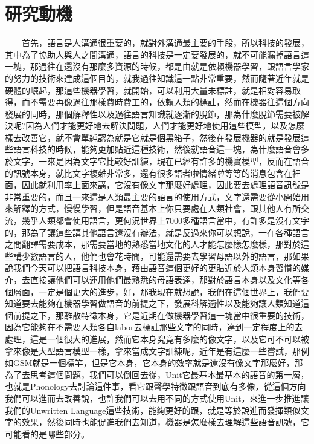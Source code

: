 \section{研究動機}

　　首先，語言是人溝通很重要的，就對外溝通最主要的手段，所以科技的發展，其中為了協助人與人之間溝通，語言的科技是一定要發展的，就不可能漏掉語言這一塊，那過往在還沒有那麼多資源的時候，都是由就是依賴機器學習，跟語言學家的努力的技術來達成這個目的，就我過往知識這一點非常重要，然而隨著近年就是硬體的崛起，那這些機器學習，就開始，可以利用大量未標註，就是相對容易取得，而不需要再像過往那樣費時費工的，依賴人類的標註，然而在機器往這個方向發展的同時，那個解釋性以及過往語言知識就逐漸的脫節，那為什麼脫節需要被解決呢?因為人們才能更好地去解決問題，人們才能更好地使用這些模型，以及怎麼樣去改善它，就不會單純認為就是它就是個黑箱子，然後在發展機器的就是發展這些語言科技的時候，能夠更加貼近這種技術，然後就語音這一塊，為什麼語音會多於文字，一來是因為文字它比較好訓練，現在已經有許多的機實模型，反而在語音的訊號本身，就比文字複雜非常多，還有很多語者啦情緒啦等等的消息包含在裡面，因此就利用率上面來講，它沒有像文字那麼好處理，因此要去處理語音訊號是非常重要的，而且一來這是人類最主要的語言的使用方式，文字還需要從小開始用來解釋的方式，慢慢學習，但是語音基本上你只要處在人類社會，跟其他人有所交流，幾乎人類都會使用語言，更何況世界上7000多種語言當中，有許多是沒有文字的，那為了讓這些講其他語言還沒有辦法，就是反過來你可以想說，一在各種語言之間翻譯需要成本，那需要當地的熟悉當地文化的人才能怎麼樣怎麼樣，那對於這些講少數語言的人，他們也會花時間，可能還需要去學習母語以外的語言，那如果說我們今天可以把語言科技本身，藉由語音這個更好的更貼近於人類本身習慣的媒介，去直接讓他們可以運用他們最熟悉的母語表達，那對於語言本身以及文化等各個層面，一定是個更大的進步，好，那我現在就想說，我們在這個世界上，我們要知道要去能夠在機器學習做語音的前提之下，發展科解適性以及能夠讓人類知道這個前提之下，那離散特徵本身，它是近期在做機器學習這一塊當中很重要的技術，因為它能夠在不需要人類各自labor去標註那些文字的同時，達到一定程度上的去處理，這是一個很大的進展，然而它本身究竟有多麼的像文字，以及它可不可以被拿來像是大型語言模型一樣，拿來當成文字訓練呢，近年是有這麼一些嘗試，那例如GSM就是一個標竿，但是它本身，它本身的效率就是還沒有像文字那麼好，那為了去思考這個問題，我們可以倒回去從，Unit它最基本最基本的語音的第一層，也就是Phonology去討論這件事，看它跟聲學特徵跟語音到底有多像，從這個方向我們可以進而去改善說，也許我們可以去用不同的方式使用Unit，來進一步推進讓我們的Unwritten Language這些技術，能夠更好的跟，就是等於說進而發揮類似文字的效果，然後同時也能促進我們去知道，機器是怎麼樣去理解這些語音訊號，它可能看的是哪些部分。

